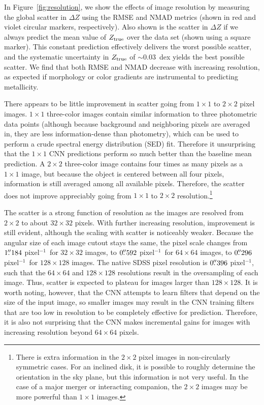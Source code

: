 \documentclass[fleqn,usenatbib]{mnras}
\newcommand{\perpixel}{\hbox{pixel$^{-1}$}}
\begin{document}
In Figure~\ref{fig:resolution}, we show the effects of image resolution by measuring the global scatter in $\Delta Z$ using the RMSE and NMAD metrics (shown in red and violet circular markers, respectively). Also shown is the scatter in $\Delta Z$ if we always predict the mean value of $Z_{\rm true}$ over the data set (shown using a square marker). This constant prediction effectively delivers the worst possible scatter, and the \cite{Tremonti2004} systematic uncertainty in $Z_{\rm true}$ of $\sim 0.03$~dex yields the best possible scatter. We find that both RMSE and NMAD decrease with increasing resolution, as expected if morphology or color gradients are instrumental to predicting metallicity.

There appears to be little improvement in scatter going from $1 \times 1$ to $2\times 2$ pixel images. $1\times 1$ three-color images contain similar information to three photometric data points (although because background and neighboring pixels are averaged in, they are less information-dense than photometry), which can be used to perform a crude spectral energy distribution (SED) fit. Therefore it unsurprising that the $1 \times 1$ CNN predictions perform so much better than the baseline mean prediction. A $2 \times 2$ three-color image contains four times as many pixels as a $1\times 1$ image, but because the object is centered between all four pixels, information is still averaged among all available pixels. Therefore, the scatter does not improve appreciably going from $1 \times 1$ to $2 \times 2$ resolution.\footnote{There is extra information in the $2\times 2$ pixel images in non-circularly symmetric cases. For an inclined disk, it is possible to roughly determine the orientation in the sky plane, but this information is not very useful. In the case of a major merger or interacting companion, the $2\times 2$ images may be more powerful than $1 \times 1$ images.}

The scatter is a strong function of resolution as the images are resolved from $2 \times 2$ to about $32 \times 32$ pixels. With further increasing resolution, improvement is still evident, although the scaling with scatter is noticeably weaker. Because the angular size of each image cutout stays the same, the pixel scale changes from $1\hbox{$.\!\!^{\prime\prime}$}184$ \perpixel\ for $32 \times 32$ images, to $0\hbox{$.\!\!^{\prime\prime}$}592$ \perpixel\ for $64 \times 64$ images, to $0\hbox{$.\!\!^{\prime\prime}$}296$ \perpixel\ for $128 \times 128$ images. The native SDSS pixel resolution is $0\hbox{$.\!\!^{\prime\prime}$}396$ \perpixel, such that the $64 \times 64$ and $128 \times 128$ resolutions result in the oversampling of each image. Thus, scatter is expected to plateau for images larger than $128 \times 128$. It is worth noting, however, that the CNN attempts to learn filters that depend on the size of the input image, so smaller images may result in the CNN training filters that are too low in resolution to be completely effective for prediction. Therefore, it is also not surprising that the CNN makes incremental gains for images with increasing resolution beyond $64 \times 64$ pixels.
\end{document}
